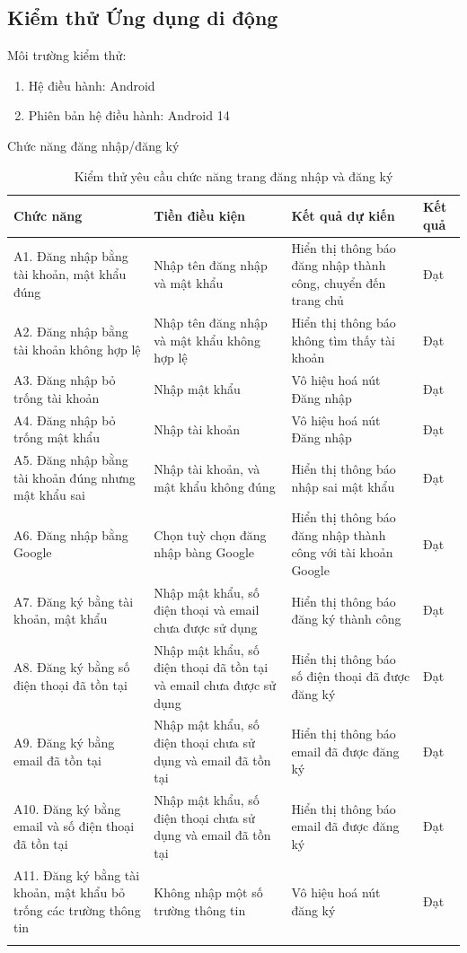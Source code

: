 \subsection{Kiểm thử Ứng dụng di động}
Môi trường kiểm thử:
\begin{enumerate}[-]
    \item Hệ điều hành: Android
    \item Phiên bản hệ điều hành: Android 14
\end{enumerate}
\noindent Chức năng đăng nhập/đăng ký
\begin{longtable}{|p{4cm}|p{4cm}|p{4cm}|p{2cm}|}
    \hline
    Chức năng & Tiền điều kiện & Kết quả dự kiến & Kết quả \\
    \hline
    A1. Đăng nhập bằng tài khoản, mật khẩu đúng & Nhập tên đăng nhập và mật khẩu & Hiển thị thông báo đăng nhập thành công, chuyển đến trang chủ & Đạt\\
    \hline
    A2. Đăng nhập bằng tài khoản không hợp lệ & Nhập tên đăng nhập và mật khẩu không hợp lệ & Hiển thị thông báo không tìm thấy tài khoản & Đạt\\
    \hline
    A3. Đăng nhập bỏ trống tài khoản & Nhập mật khẩu & Vô hiệu hoá nút Đăng nhập & Đạt\\
    \hline
    A4. Đăng nhập bỏ trống mật khẩu & Nhập tài khoản & Vô hiệu hoá nút Đăng nhập & Đạt\\
    \hline
    A5. Đăng nhập bằng tài khoản đúng nhưng mật khẩu sai & Nhập tài khoản, và mật khẩu không đúng & Hiển thị thông báo nhập sai mật khẩu & Đạt\\
    \hline
    A6. Đăng nhập bằng Google & Chọn tuỳ chọn đăng nhập bàng Google & Hiển thị thông báo đăng nhập thành công với tài khoản Google & Đạt\\
    \hline
     A7. Đăng ký bằng tài khoản, mật khẩu & Nhập mật khẩu, số điện thoại và email chưa được sử dụng & Hiển thị thông báo đăng ký thành công & Đạt\\
    \hline
    A8. Đăng ký bằng số điện thoại đã tồn tại & Nhập mật khẩu, số điện thoại đã tồn tại và email chưa được sử dụng & Hiển thị thông báo số điện thoại đã được đăng ký & Đạt\\
    \hline
    A9. Đăng ký bằng email đã tồn tại & Nhập mật khẩu, số điện thoại chưa sử dụng và email đã tồn tại & Hiển thị thông báo email đã được đăng ký & Đạt\\
    \hline
    A10. Đăng ký bằng email và số điện thoại đã tồn tại & Nhập mật khẩu, số điện thoại chưa sử dụng và email đã tồn tại & Hiển thị thông báo email đã được đăng ký & Đạt\\
    \hline
    A11. Đăng ký bằng tài khoản, mật khẩu bỏ trống các trường thông tin & Không nhập một số trường thông tin & Vô hiệu hoá nút đăng ký & Đạt\\
    \hline
    \caption{Kiểm thử yêu cầu chức năng trang đăng nhập và đăng ký}
\end{longtable}

